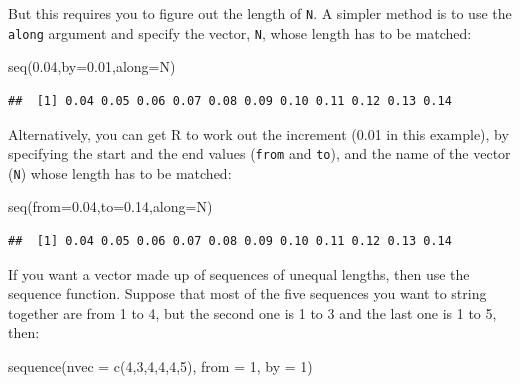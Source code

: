 \documentclass[
]{book}
\newenvironment{Shaded}{\begin{snugshade}}{\end{snugshade}}
\newcommand{\AttributeTok}[1]{\textcolor[rgb]{0.77,0.63,0.00}{#1}}
\newcommand{\DecValTok}[1]{\textcolor[rgb]{0.00,0.00,0.81}{#1}}
\newcommand{\FloatTok}[1]{\textcolor[rgb]{0.00,0.00,0.81}{#1}}
\newcommand{\FunctionTok}[1]{\textcolor[rgb]{0.00,0.00,0.00}{#1}}
\newcommand{\NormalTok}[1]{#1}
\begin{document}
But this requires you to figure out the length of \texttt{N}. A simpler method is to use the \texttt{along} argument and specify the vector, \texttt{N}, whose length has to be matched:

\begin{Shaded}
\begin{Highlighting}[]
\FunctionTok{seq}\NormalTok{(}\FloatTok{0.04}\NormalTok{,}\AttributeTok{by=}\FloatTok{0.01}\NormalTok{,}\AttributeTok{along=}\NormalTok{N)}
\end{Highlighting}
\end{Shaded}

\begin{verbatim}
##  [1] 0.04 0.05 0.06 0.07 0.08 0.09 0.10 0.11 0.12 0.13 0.14
\end{verbatim}

Alternatively, you can get R to work out the increment (0.01 in this example), by specifying the start and the end values (\texttt{from} and \texttt{to}), and the name of the vector (\texttt{N}) whose length has to be matched:

\begin{Shaded}
\begin{Highlighting}[]
\FunctionTok{seq}\NormalTok{(}\AttributeTok{from=}\FloatTok{0.04}\NormalTok{,}\AttributeTok{to=}\FloatTok{0.14}\NormalTok{,}\AttributeTok{along=}\NormalTok{N)}
\end{Highlighting}
\end{Shaded}

\begin{verbatim}
##  [1] 0.04 0.05 0.06 0.07 0.08 0.09 0.10 0.11 0.12 0.13 0.14
\end{verbatim}

If you want a vector made up of sequences of unequal lengths, then use the sequence function. Suppose that most of the five sequences you want to string together are from 1 to 4, but the second one is 1 to 3 and the last one is 1 to 5, then:

\begin{Shaded}
\begin{Highlighting}[]
\FunctionTok{sequence}\NormalTok{(}\AttributeTok{nvec =} \FunctionTok{c}\NormalTok{(}\DecValTok{4}\NormalTok{,}\DecValTok{3}\NormalTok{,}\DecValTok{4}\NormalTok{,}\DecValTok{4}\NormalTok{,}\DecValTok{4}\NormalTok{,}\DecValTok{5}\NormalTok{), }\AttributeTok{from =} \DecValTok{1}\NormalTok{, }\AttributeTok{by =} \DecValTok{1}\NormalTok{)}
\end{Highlighting}
\end{Shaded}
\end{document}
